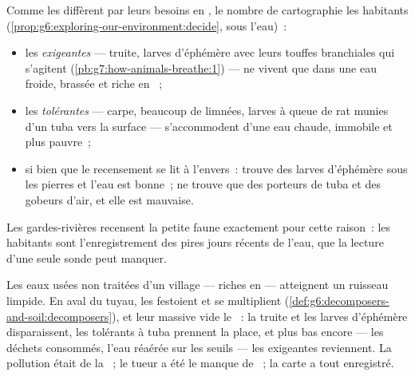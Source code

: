 \begin{proposition}\label{prop:g7:oxygen-in-the-water:map}
Comme les  diffèrent par leurs besoins en , le
nombre de  cartographie les habitants
(\cref{prop:g6:exploring-our-environment:decide}, sous l'eau)~:
\begin{itemize}
  \item les  \emph{exigeantes} --- truite, larves d'éphémère
        avec leurs touffes branchiales qui s'agitent
        (\cref{pb:g7:how-animals-breathe:1}) --- ne vivent que dans
        une eau froide, brassée et riche en ~;
  \item les  \emph{tolérantes} --- carpe, beaucoup de
        limnées, larves à queue de rat munies d'un tuba vers la
        surface --- s'accommodent d'une eau chaude, immobile et plus
        pauvre~;
  \item si bien que le recensement se lit à l'envers~: trouve des
        larves d'éphémère sous les pierres et l'eau est bonne~;
        ne trouve que des porteurs de tuba et des gobeurs d'air, et
        elle est mauvaise.
\end{itemize}
Les gardes-rivières recensent la petite faune exactement pour cette
raison~: les habitants sont l'enregistrement des pires jours récents
de l'eau, que la lecture d'une seule sonde peut manquer.
\end{proposition}
\admitted

\begin{example}\label{ex:g7:oxygen-in-the-water:waste}
Les eaux usées non traitées d'un village --- riches en  --- atteignent un ruisseau limpide. En aval du tuyau, les
 festoient et se multiplient
(\cref{def:g6:decomposers-and-soil:decomposers}), et leur
 massive vide le ~: la truite et les larves
d'éphémère disparaissent, les tolérants à tuba prennent la place, et
plus bas encore --- les déchets consommés, l'eau réaérée sur les
seuils --- les  exigeantes reviennent. La pollution était de
la ~; le tueur a été le manque de ~; la
carte a tout enregistré.
\end{example}

